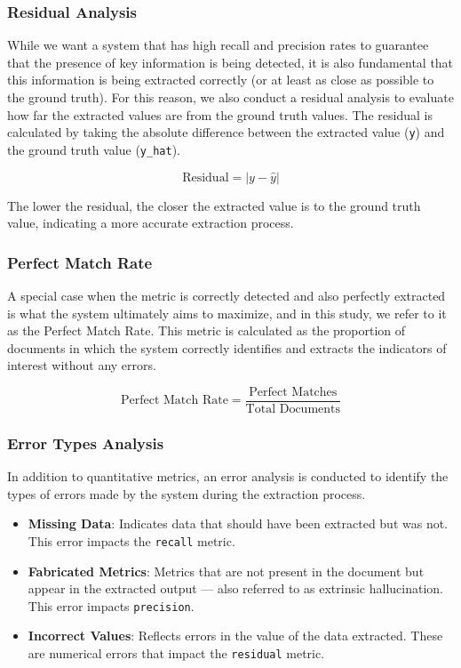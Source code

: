\documentclass[english, 12pt, a4paper, elec, utf8, a-2b, online]{aaltothesis}
\begin{document}
\subsubsection{Residual Analysis}

While we want a system that has high recall and precision rates to guarantee that the presence of key information is being detected, it is also fundamental that this information is being extracted correctly (or at least as close as possible to the ground truth).
For this reason, we also conduct a residual analysis to evaluate how far the extracted values are from the ground truth values.
The residual is calculated by taking the absolute difference between the extracted value (\texttt{y}) and the ground truth value (\texttt{y\_hat}).

\begin{equation}
    \text{Residual} = |y - \hat{y}|
\end{equation}

The lower the residual, the closer the extracted value is to the ground truth value, indicating a more accurate extraction process.

\subsubsection{Perfect Match Rate}

A special case when the metric is correctly detected and also perfectly extracted is what the system ultimately aims to maximize, and in this study, we refer to it as the Perfect Match Rate.
This metric is calculated as the proportion of documents in which the system correctly identifies and extracts the indicators of interest without any errors.

\begin{equation}
    \text{Perfect Match Rate} = \frac{\text{Perfect Matches}}{\text{Total Documents}}
\end{equation}

\subsubsection{Error Types Analysis}

In addition to quantitative metrics, an error analysis is conducted to identify the types of errors made by the system during the extraction process.

\begin{itemize}
    \item \textbf{Missing Data}: Indicates data that should have been extracted but was not.
    This error impacts the \texttt{recall} metric.
    \item \textbf{Fabricated Metrics}: Metrics that are not present in the document but appear in the extracted output --- also referred to as extrinsic hallucination.
    This error impacts \texttt{precision}.
    \item \textbf{Incorrect Values}: Reflects errors in the value of the data extracted.
    These are numerical errors that impact the \texttt{residual} metric.
\end{itemize}
\end{document}
